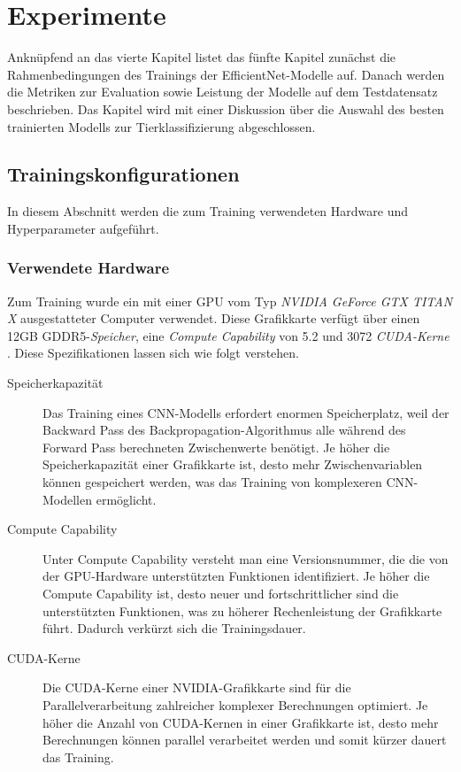 \chapter{Experimente} \label{chap:experimentresult}

Anknüpfend an das vierte Kapitel listet das fünfte Kapitel zunächst die Rahmenbedingungen des Trainings der EfficientNet-Modelle auf. Danach werden die Metriken zur Evaluation sowie Leistung der Modelle auf dem Testdatensatz beschrieben. Das Kapitel wird mit einer Diskussion über die Auswahl des besten trainierten Modells zur Tierklassifizierung abgeschlossen.

\section{Trainingskonfigurationen}

In diesem Abschnitt werden die zum Training verwendeten Hardware und Hyperparameter aufgeführt.

\subsection{Verwendete Hardware}

Zum Training wurde ein mit einer GPU vom Typ \emph{NVIDIA GeForce GTX TITAN X} ausgestatteter Computer verwendet. Diese Grafikkarte verfügt über einen 12GB GDDR5-\emph{Speicher}, eine \emph{Compute Capability} von 5.2 und 3072 \emph{CUDA-Kerne} \cite{gtxtitanx}. Diese Spezifikationen lassen sich wie folgt verstehen.

\begin{description}
	\item[Speicherkapazität]

	Das Training eines CNN-Modells erfordert enormen Speicherplatz, weil der Backward Pass des Backpropagation-Algorithmus alle während des Forward Pass berechneten Zwischenwerte benötigt. Je höher die Speicherkapazität einer Grafikkarte ist, desto mehr Zwischenvariablen können gespeichert werden, was das Training von komplexeren CNN-Modellen ermöglicht.
	
	\item[Compute Capability] 
	
	Unter Compute Capability versteht man eine Versionsnummer, die die von der GPU-Hardware unterstützten Funktionen identifiziert. Je höher die Compute Capability ist, desto neuer und fortschrittlicher sind die unterstützten Funktionen, was zu höherer Rechenleistung der Grafikkarte führt. Dadurch verkürzt sich die Trainingsdauer.
	
	\item[CUDA-Kerne] 
	
	Die CUDA-Kerne einer NVIDIA-Grafikkarte sind für die Parallelverarbeitung zahlreicher komplexer Berechnungen optimiert. Je höher die Anzahl von CUDA-Kernen in einer Grafikkarte ist, desto mehr Berechnungen können parallel verarbeitet werden und somit kürzer dauert das Training.
\end{description}

